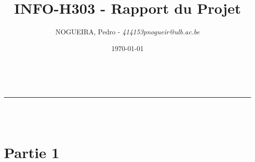 \documentclass[12pt,a4paper]{article}
\makeatletter
\newcommand{\linha}{\rule{\linewidth}{0.4mm}}
\renewcommand{\maketitle}{
\begin{center}
\vspace{2ex}
{\huge\textsc{\@title}}
\vspace{1ex}\\
\linha\\
\@author\\\@date
\vspace{4ex}
\end{center}
}
\makeatother
\begin{document}
	\title{INFO-H303 - Rapport du Projet}
	\author{NOGUEIRA, Pedro - \emph{414153}\hfill\textit{pnogueir@ulb.ac.be}}
	\date{\today}
	\maketitle


	\section*{Partie 1}
\end{document}
